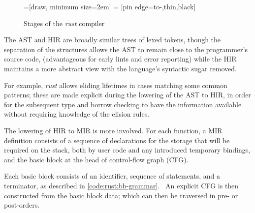 \begin{figure}[!h]
    \centering
    =[draw, minimum size=2em]
     = [pin edge={to-,thin,black}]
    \caption{Stages of the \emph{rust} compiler}
    \label{fig:rust:compiler-stages}
\end{figure}

The AST and HIR are broadly similar trees of lexed tokens, though the separation of the structures allows the AST to remain close to the programmer's source code, (advantageous for early lints and error reporting) while the HIR maintains a more abstract view with the language's syntactic sugar removed.

For example, \emph{rust} allows eliding lifetimes in cases matching some common patterns; these are made explicit during the lowering of the AST to HIR, in order for the subsequent type and borrow checking to have the information available without requiring knowledge of the elision rules. \cite{rust_rfc1191}

The lowering of HIR to MIR is more involved. For each function, a MIR definition consists of a sequence of declarations for the storage that will be required on the stack, both by user code and any introduced temporary bindings, and the basic block at the head of control-flow graph (CFG).

Each basic block consists of an identifier, sequence of statements, and a terminator, as described in \cref{code:rust:bb-grammar}.~\cite{rust_rfc1211} An explicit CFG is then constructed from the basic block data; which can then be traversed in pre- or post-orders.

